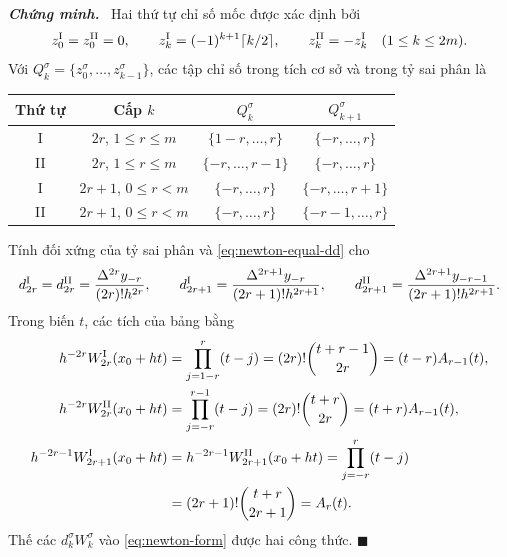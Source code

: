 \documentclass[12pt,a4paper,oneside]{book}
\numberwithin{algorithm}{chapter}
\theoremstyle{definition}
\newenvironment{chungminh}{\par\medskip\noindent\textbf{\textit{\color{mainblue}Chứng minh.}}\ }{\hfill$\blacksquare$\par\medskip}
\begin{document}
\begin{chungminh}
Hai thứ tự chỉ số mốc được xác định bởi
\[
 z_0^{\rm I}=z_0^{\rm II}=0,\qquad
 z_k^{\rm I}=(-1)^{k+1}\lceil k/2\rceil,
 \qquad z_k^{\rm II}=-z_k^{\rm I}\quad(1\leq k\leq2m).
\]
Với $Q_k^\sigma=\{z_0^\sigma,\ldots,z_{k-1}^\sigma\}$, các tập chỉ số trong tích cơ sở và trong tỷ sai phân là
\begin{center}
\small
\begin{tabular}{c|c|c|c}\toprule
Thứ tự&Cấp $k$&$Q_k^\sigma$&$Q_{k+1}^\sigma$\\\midrule
I&$2r$, $1\leq r\leq m$&$\{1-r,\ldots,r\}$&$\{-r,\ldots,r\}$\\
II&$2r$, $1\leq r\leq m$&$\{-r,\ldots,r-1\}$&$\{-r,\ldots,r\}$\\
I&$2r+1$, $0\leq r<m$&$\{-r,\ldots,r\}$&$\{-r,\ldots,r+1\}$\\
II&$2r+1$, $0\leq r<m$&$\{-r,\ldots,r\}$&$\{-r-1,\ldots,r\}$\\\bottomrule
\end{tabular}
\end{center}
Tính đối xứng của tỷ sai phân và \eqref{eq:newton-equal-dd} cho
\[
 d_{2r}^{\rm I}=d_{2r}^{\rm II}=\frac{\Delta^{2r}y_{-r}}{(2r)!h^{2r}},\qquad
 d_{2r+1}^{\rm I}=\frac{\Delta^{2r+1}y_{-r}}{(2r+1)!h^{2r+1}},\qquad
 d_{2r+1}^{\rm II}=\frac{\Delta^{2r+1}y_{-r-1}}{(2r+1)!h^{2r+1}}.
\]
Trong biến $t$, các tích của bảng bằng
\begin{align*}
 h^{-2r}W_{2r}^{\rm I}(x_0+ht)
 &=\prod_{j=1-r}^{r}(t-j)
 =(2r)!\binom{t+r-1}{2r}=(t-r)A_{r-1}(t),\\
 h^{-2r}W_{2r}^{\rm II}(x_0+ht)
 &=\prod_{j=-r}^{r-1}(t-j)
 =(2r)!\binom{t+r}{2r}=(t+r)A_{r-1}(t),\\
 h^{-2r-1}W_{2r+1}^{\rm I}(x_0+ht)
 &=h^{-2r-1}W_{2r+1}^{\rm II}(x_0+ht)
 =\prod_{j=-r}^{r}(t-j)\\
 &=(2r+1)!\binom{t+r}{2r+1}=A_r(t).
\end{align*}
Thế các $d_k^\sigma W_k^\sigma$ vào \eqref{eq:newton-form} được hai công thức.
\end{chungminh}
\end{document}
